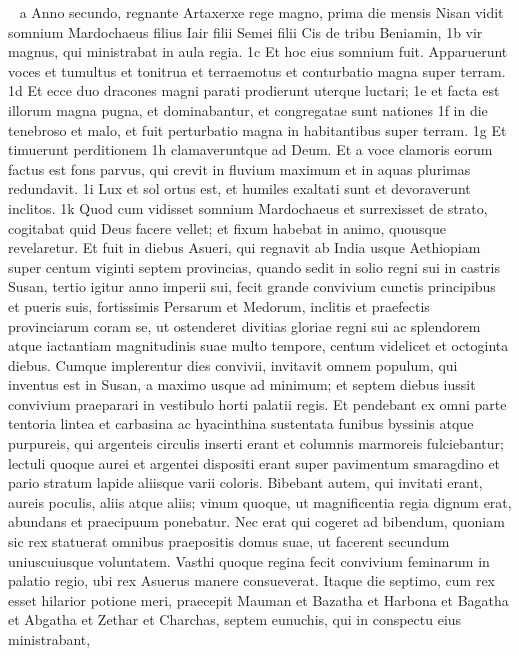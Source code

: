 
\begin{biblechapter}  
\verse a Anno secundo, regnante Artaxerxe rege magno, prima die mensis Nisan vidit somnium Mardochaeus filius Iair filii Semei filii Cis de tribu Beniamin, 1b vir magnus, qui ministrabat in aula regia. 1c Et hoc eius somnium fuit. Apparuerunt voces et tumultus et tonitrua et terraemotus et conturbatio magna super terram. 1d Et ecce duo dracones magni parati prodierunt uterque luctari; 1e et facta est illorum magna pugna, et dominabantur, et congregatae sunt nationes 1f in die tenebroso et malo, et fuit perturbatio magna in habitantibus super terram. 1g Et timuerunt perditionem 1h clamaveruntque ad Deum. Et a voce clamoris eorum factus est fons parvus, qui crevit in fluvium maximum et in aquas plurimas redundavit.  1i Lux et sol ortus est, et humiles exaltati sunt et devoraverunt inclitos.  1k Quod cum vidisset somnium Mardochaeus et surrexisset de strato, cogitabat quid Deus facere vellet; et fixum habebat in animo, quousque revelaretur. 
\verse Et fuit in diebus Asueri, qui regnavit ab India usque Aethiopiam super centum viginti septem provincias, 
\verse quando sedit in solio regni sui in castris Susan, 
\verse tertio igitur anno imperii sui, fecit grande convivium cunctis principibus et pueris suis, fortissimis Persarum et Medorum, inclitis et praefectis provinciarum coram se, 
\verse ut ostenderet divitias gloriae regni sui ac splendorem atque iactantiam magnitudinis suae multo tempore, centum videlicet et octoginta diebus. 
\verse Cumque implerentur dies convivii, invitavit omnem populum, qui inventus est in Susan, a maximo usque ad minimum; et septem diebus iussit convivium praeparari in vestibulo horti palatii regis. 
\verse Et pendebant ex omni parte tentoria lintea et carbasina ac hyacinthina sustentata funibus byssinis atque purpureis, qui argenteis circulis inserti erant et columnis marmoreis fulciebantur; lectuli quoque aurei et argentei dispositi erant super pavimentum smaragdino et pario stratum lapide aliisque varii coloris. 
\verse Bibebant autem, qui invitati erant, aureis poculis, aliis atque aliis; vinum quoque, ut magnificentia regia dignum erat, abundans et praecipuum ponebatur. 
\verse Nec erat qui cogeret ad bibendum, quoniam sic rex statuerat omnibus praepositis domus suae, ut facerent secundum uniuscuiusque voluntatem. 
\verse Vasthi quoque regina fecit convivium feminarum in palatio regio, ubi rex Asuerus manere consueverat. 
\verse Itaque die septimo, cum rex esset hilarior potione meri, praecepit Mauman et Bazatha et Harbona et Bagatha et Abgatha et Zethar et Charchas, septem eunuchis, qui in conspectu eius ministrabant, 

\end{biblechapter}
